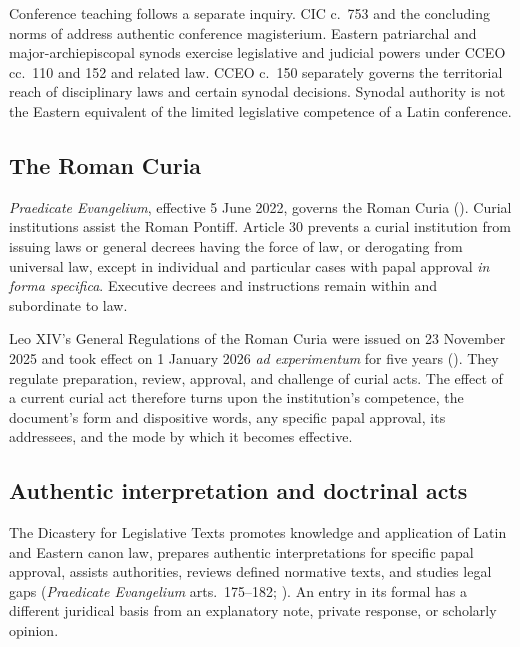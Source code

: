 Conference teaching follows a separate inquiry. CIC c.~753 and the concluding norms of  address authentic conference magisterium. Eastern patriarchal and major-archiepiscopal synods exercise legislative and judicial powers under CCEO cc.~110 and 152 and related law. CCEO c.~150 separately governs the territorial reach of disciplinary laws and certain synodal decisions. Synodal authority is not the Eastern equivalent of the limited legislative competence of a Latin conference.

\subsection{The Roman Curia}

\emph{Praedicate Evangelium}, effective 5 June 2022, governs the Roman Curia (). Curial institutions assist the Roman Pontiff. Article 30 prevents a curial institution from issuing laws or general decrees having the force of law, or derogating from universal law, except in individual and particular cases with papal approval \emph{in forma specifica}. Executive decrees and instructions remain within and subordinate to law.

Leo XIV's General Regulations of the Roman Curia were issued on 23 November 2025 and took effect on 1 January 2026 \emph{ad experimentum} for five years (). They regulate preparation, review, approval, and challenge of curial acts. The effect of a current curial act therefore turns upon the institution's competence, the document's form and dispositive words, any specific papal approval, its addressees, and the mode by which it becomes effective.

\subsection{Authentic interpretation and doctrinal acts}

The Dicastery for Legislative Texts promotes knowledge and application of Latin and Eastern canon law, prepares authentic interpretations for specific papal approval, assists authorities, reviews defined normative texts, and studies legal gaps (\emph{Praedicate Evangelium} arts.~175--182; ). An entry in its formal  has a different juridical basis from an explanatory note, private response, or scholarly opinion.

